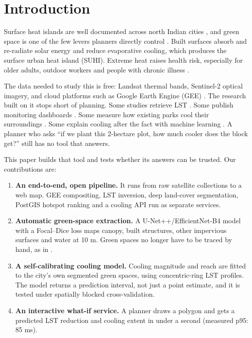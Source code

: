\documentclass[conference]{IEEEtran}
\providecommand{\tightlist}{\setlength{\itemsep}{0pt}\setlength{\parskip}{0pt}}
\begin{document}
\section{Introduction}\label{introduction}

Surface heat islands are well documented across north Indian cities
\cite{b2}, and green space is one of the few levers planners directly
control \cite{b3,b4}. Built surfaces absorb and re-radiate solar energy
and reduce evaporative cooling, which produces the surface urban heat
island (SUHI). Extreme heat raises health risk, especially for older
adults, outdoor workers and people with chronic illness \cite{b20}.

The data needed to study this is free: Landsat thermal bands, Sentinel-2
optical imagery, and cloud platforms such as Google Earth Engine (GEE)
\cite{b15}. The research built on it stops short of planning. Some
studies retrieve LST \cite{b1,b5}. Some publish monitoring dashboards
\cite{b2}. Some measure how existing parks cool their surroundings
\cite{b3}. Some explain cooling after the fact with machine learning
\cite{b4}. A planner who asks ``if we plant this 2-hectare plot, how
much cooler does the block get?'' still has no tool that answers.

This paper builds that tool and tests whether its answers can be
trusted. Our contributions are:

\begin{enumerate}
\def\labelenumi{\arabic{enumi}.}
\tightlist
\item
  \textbf{An end-to-end, open pipeline.} It runs from raw satellite
  collections to a web map. GEE compositing, LST inversion, deep
  land-cover segmentation, PostGIS hotspot ranking and a cooling API run
  as separate services.
\item
  \textbf{Automatic green-space extraction.} A U-Net++/EfficientNet-B4
  model with a Focal--Dice loss maps canopy, built structures, other
  impervious surfaces and water at 10 m. Green spaces no longer have to
  be traced by hand, as in \cite{b3}.
\item
  \textbf{A self-calibrating cooling model.} Cooling magnitude and reach
  are fitted to the city's own segmented green spaces, using
  concentric-ring LST profiles. The model returns a prediction interval,
  not just a point estimate, and it is tested under spatially blocked
  cross-validation.
\item
  \textbf{An interactive what-if service.} A planner draws a polygon and
  gets a predicted LST reduction and cooling extent in under a second
  (measured p95: 85 ms).
\end{enumerate}
\end{document}
